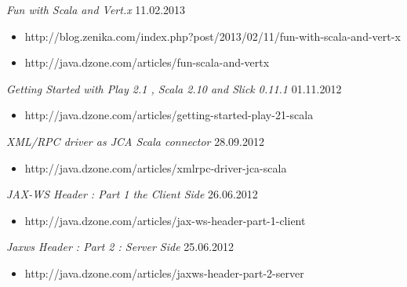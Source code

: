 \documentclass{res}
\begin{document}
\begin{resume}
{{\sl Fun with Scala and Vert.x}  \hfill    11.02.2013	\\
\vspace{-5mm}  \begin{itemize}
\item[]  \scriptsize http://blog.zenika.com/index.php?post/2013/02/11/fun-with-scala-and-vert-x
\vspace{-2mm}
\item[]  \scriptsize http://java.dzone.com/articles/fun-scala-and-vertx
\end{itemize}
\vspace{-2mm}

{\sl Getting Started with Play 2.1 , Scala 2.10 and Slick 0.11.1}  \hfill    01.11.2012	\\
\vspace{-5mm}  \begin{itemize}
\item[]  \scriptsize http://java.dzone.com/articles/getting-started-play-21-scala
\end{itemize}
\vspace{-2mm}

{\sl XML/RPC driver as JCA Scala connector}  \hfill    28.09.2012	\\
\vspace{-5mm}  \begin{itemize}
\item[]  \scriptsize http://java.dzone.com/articles/xmlrpc-driver-jca-scala
\end{itemize}
\vspace{-2mm}

{\sl JAX-WS Header : Part 1 the Client Side}  \hfill   26.06.2012	\\
\vspace{-5mm}  \begin{itemize}
\item[]  \scriptsize http://java.dzone.com/articles/jax-ws-header-part-1-client
\end{itemize}
\vspace{-2mm}

{\sl Jaxws Header : Part 2 : Server Side}  \hfill    25.06.2012	\\
\vspace{-5mm}  \begin{itemize}
\item[]  \scriptsize http://java.dzone.com/articles/jaxws-header-part-2-server
\end{itemize}
\vspace{-2mm}

}
\end{resume}
\end{document}
